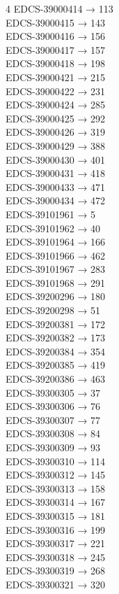 \begin{multicols}{4}
EDCS-39000414 → 113\\
EDCS-39000415 → 143\\
EDCS-39000416 → 156\\
EDCS-39000417 → 157\\
EDCS-39000418 → 198\\
EDCS-39000421 → 215\\
EDCS-39000422 → 231\\
EDCS-39000424 → 285\\
EDCS-39000425 → 292\\
EDCS-39000426 → 319\\
EDCS-39000429 → 388\\
EDCS-39000430 → 401\\
EDCS-39000431 → 418\\
EDCS-39000433 → 471\\
EDCS-39000434 → 472\\
EDCS-39101961 → 5\\
EDCS-39101962 → 40\\
EDCS-39101964 → 166\\
EDCS-39101966 → 462\\
EDCS-39101967 → 283\\
EDCS-39101968 → 291\\
EDCS-39200296 → 180\\
EDCS-39200298 → 51\\
EDCS-39200381 → 172\\
EDCS-39200382 → 173\\
EDCS-39200384 → 354\\
EDCS-39200385 → 419\\
EDCS-39200386 → 463\\
EDCS-39300305 → 37\\
EDCS-39300306 → 76\\
EDCS-39300307 → 77\\
EDCS-39300308 → 84\\
EDCS-39300309 → 93\\
EDCS-39300310 → 114\\
EDCS-39300312 → 145\\
EDCS-39300313 → 158\\
EDCS-39300314 → 167\\
EDCS-39300315 → 181\\
EDCS-39300316 → 199\\
EDCS-39300317 → 221\\
EDCS-39300318 → 245\\
EDCS-39300319 → 268\\
EDCS-39300321 → 320\\

\end{multicols}
